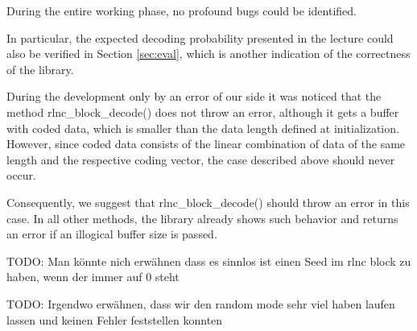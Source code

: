 \documentclass[a4paper,english,10pt]{tumarticle}
\begin{document}
During the entire working phase, no profound bugs could be identified.

In particular, the expected decoding probability presented in the lecture 
could also be verified in Section \ref{sec:eval}, which is another indication of the correctness of the library.

During the development only by an error of our side it was noticed that the method rlnc\_block\_decode() does not 
throw an error, although it gets a buffer with coded data, which is smaller than the data length defined 
at initialization. However, since coded data consists of the linear combination of data of the same length and 
the respective coding vector, the case described above should never occur.

Consequently, we suggest that rlnc\_block\_decode() should throw an error in this case. In all other methods, 
the library already shows such behavior and returns an error if an illogical buffer size is passed.

TODO: Man könnte nich erwähnen dass es sinnlos ist einen Seed im rlnc block zu haben, wenn der immer auf 0 steht

TODO: Irgendwo erwähnen, dass wir den random mode sehr viel haben laufen lassen und keinen Fehler feststellen konnten
\end{document}
